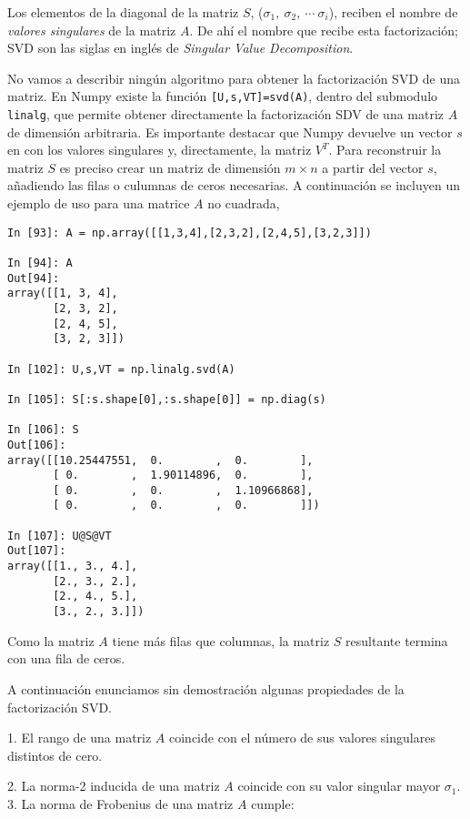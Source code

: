 \begin{paracol}{2}
Los elementos de la diagonal de la matriz $S$, ($\sigma_1, \ \sigma_2, \  \cdots \ \sigma_i$), reciben el nombre de \emph{valores singulares} de la matriz $A$. De ahí el nombre que recibe esta factorización; SVD son las siglas en inglés de \emph{Singular Value Decomposition}.

No vamos a describir ningún algoritmo para obtener la factorización SVD de una matriz. En Numpy existe la función \texttt{[U,s,VT]=svd(A)}, dentro del submodulo \texttt{linalg}, que permite obtener directamente la factorización SDV de una matriz $A$ de dimensión arbitraria. Es importante destacar que Numpy devuelve un vector $s$ en con los valores singulares y, directamente, la matriz $V^T$. Para reconstruir la matriz $S$ es preciso crear un matriz de dimensión $m\times n$ a partir del vector $s$, añadiendo las filas o culumnas de ceros necesarias. A continuación se incluyen un ejemplo de uso para una matrice $A$ no cuadrada,
\end{paracol}
\begin{center}
    \begin{minipage}{0.7\textwidth}
    \begin{verbatim}
In [93]: A = np.array([[1,3,4],[2,3,2],[2,4,5],[3,2,3]])

In [94]: A
Out[94]: 
array([[1, 3, 4],
       [2, 3, 2],
       [2, 4, 5],
       [3, 2, 3]])

In [102]: U,s,VT = np.linalg.svd(A)

In [105]: S[:s.shape[0],:s.shape[0]] = np.diag(s)

In [106]: S
Out[106]: 
array([[10.25447551,  0.        ,  0.        ],
       [ 0.        ,  1.90114896,  0.        ],
       [ 0.        ,  0.        ,  1.10966868],
       [ 0.        ,  0.        ,  0.        ]])

In [107]: U@S@VT
Out[107]: 
array([[1., 3., 4.],
       [2., 3., 2.],
       [2., 4., 5.],
       [3., 2., 3.]])
\end{verbatim}
\end{minipage}
\end{center}

\begin{paracol}{2}
Como la matriz $A$ tiene más filas que columnas, la matriz $S$ resultante termina con una fila de ceros.
\end{paracol}

\begin{paracol}{2}
A continuación enunciamos sin demostración algunas propiedades de la factorización SVD.

1. El rango de una matriz $A$ coincide con el número de sus valores singulares distintos de cero.

2. La norma-2 inducida de una matriz $A$ coincide con su valor singular mayor $\sigma_1$.
3. La norma de Frobenius de una matriz $A$ cumple:
\end{paracol}

